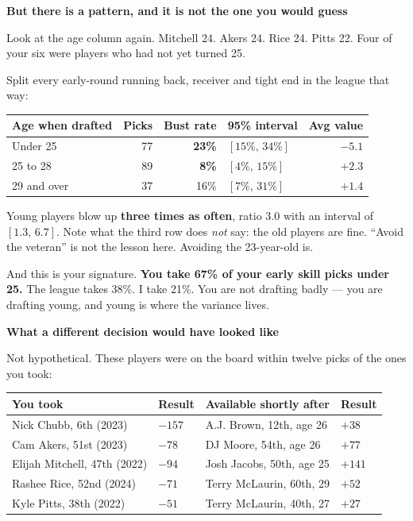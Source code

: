 \documentclass[11pt]{article}
\begin{document}
\vspace{6pt}
{\large\bfseries But there is a pattern, and it is not the one you would guess}

Look at the age column again. Mitchell 24. Akers 24. Rice 24. Pitts 22. Four of
your six were players who had not yet turned 25.

Split every early-round running back, receiver and tight end in the league that
way:

\vspace{4pt}
\begin{tabular}{lrrlr}
\toprule
Age when drafted & Picks & Bust rate & 95\% interval & Avg value \\
\midrule
Under 25    & 77 & \textbf{23\%} & $[15\%,\,34\%]$ & $-5.1$ \\
25 to 28    & 89 & \textbf{8\%}  & $[4\%,\,15\%]$  & $+2.3$ \\
29 and over & 37 & 16\%          & $[7\%,\,31\%]$  & $+1.4$ \\
\bottomrule
\end{tabular}

Young players blow up \textbf{three times as often}, ratio $3.0$ with an interval
of $[1.3,\,6.7]$. Note what the third row does \emph{not} say: the old players are
fine. ``Avoid the veteran'' is not the lesson here. Avoiding the 23-year-old is.

And this is your signature. \textbf{You take 67\% of your early skill picks under
25.} The league takes 38\%. I take 21\%. You are not drafting badly --- you are
drafting young, and young is where the variance lives.

\vspace{6pt}
{\large\bfseries What a different decision would have looked like}

Not hypothetical. These players were on the board within twelve picks of the ones
you took:

\vspace{4pt}
\begin{tabular}{llll}
\toprule
You took & Result & Available shortly after & Result \\
\midrule
Nick Chubb, 6th (2023)      & $-157$ & A.J. Brown, 12th, age 26   & $+38$ \\
Cam Akers, 51st (2023)      & $-78$  & DJ Moore, 54th, age 26     & $+77$ \\
Elijah Mitchell, 47th (2022)& $-94$  & Josh Jacobs, 50th, age 25  & $+141$ \\
Rashee Rice, 52nd (2024)    & $-71$  & Terry McLaurin, 60th, 29   & $+52$ \\
Kyle Pitts, 38th (2022)     & $-51$  & Terry McLaurin, 40th, 27   & $+27$ \\
\bottomrule
\end{tabular}
\end{document}
